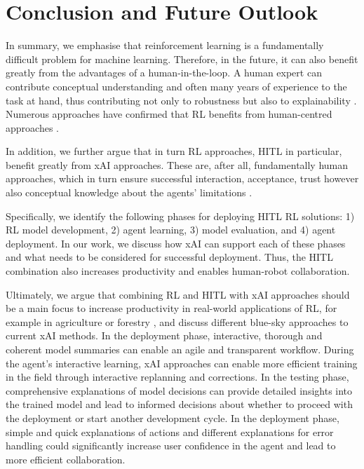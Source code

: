 \documentclass[twoside,11pt]{article}
\begin{document}
\section{Conclusion and Future Outlook}

In summary, we emphasise that reinforcement learning is a fundamentally difficult problem for machine learning. Therefore, in the future, it can also benefit greatly from the advantages of a human-in-the-loop. A human expert can contribute conceptual understanding and often many years of experience to the task at hand, thus contributing not only to robustness but also to explainability \citep{Holzinger:2021:TrustAI}. Numerous approaches have confirmed that RL benefits from human-centred approaches \citep{MatthewsonPilarski:2022:DesigningAndEvaluatingHCIML,Li:2019:HumanCenteredRLSurvey}.

In addition, we further argue that in turn RL approaches, HITL in particular, benefit greatly from xAI approaches. These are, after all, fundamentally human approaches, which in turn ensure successful interaction, acceptance, trust however also conceptual knowledge about the agents' limitations \citep{heuillet2021explainability,milani2022survey}.

Specifically, we identify the following phases for deploying HITL RL solutions: 1) RL model development, 2) agent learning, 3) model evaluation, and 4) agent deployment. In our work, we discuss how xAI can support each of these phases and what needs to be considered for successful deployment. Thus, the HITL combination also increases productivity and enables human-robot collaboration.

Ultimately, we argue that combining RL and HITL with xAI approaches should be a main focus to increase productivity in real-world applications of RL, for example in agriculture or forestry \citep{Holzinger:2022:DigitalTrans}, and discuss different blue-sky approaches to current xAI methods. In the deployment phase, interactive, thorough and coherent model summaries can enable an agile and transparent workflow. During the agent's interactive learning, xAI approaches can enable more efficient training in the field through interactive replanning and corrections. In the testing phase, comprehensive explanations of model decisions can provide detailed insights into the trained model and lead to informed decisions about whether to proceed with the deployment or start another development cycle. In the deployment phase, simple and quick explanations of actions and different explanations for error handling could significantly increase user confidence in the agent and lead to more efficient collaboration.
\end{document}
